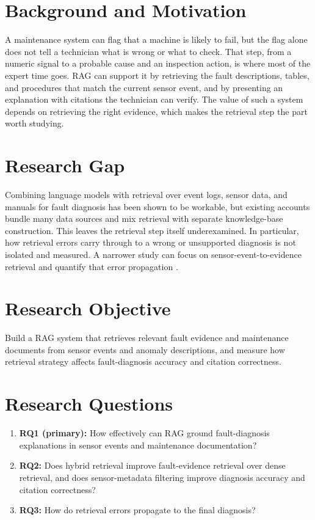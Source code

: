 \documentclass[10pt,a4paper]{article}
\begin{document}
\section{Background and Motivation}

A maintenance system can flag that a machine is likely to fail, but the flag alone does not tell a technician what is wrong or what to check. That step, from a numeric signal to a probable cause and an inspection action, is where most of the expert time goes. RAG can support it by retrieving the fault descriptions, tables, and procedures that match the current sensor event, and by presenting an explanation with citations the technician can verify. The value of such a system depends on retrieving the right evidence, which makes the retrieval step the part worth studying.

\section{Research Gap}

Combining language models with retrieval over event logs, sensor data, and manuals for fault diagnosis has been shown to be workable, but existing accounts bundle many data sources and mix retrieval with separate knowledge-base construction. This leaves the retrieval step itself underexamined. In particular, how retrieval errors carry through to a wrong or unsupported diagnosis is not isolated and measured. A narrower study can focus on sensor-event-to-evidence retrieval and quantify that error propagation \cite{gao2024survey, es2024ragas}.

\section{Research Objective}

Build a RAG system that retrieves relevant fault evidence and maintenance documents from sensor events and anomaly descriptions, and measure how retrieval strategy affects fault-diagnosis accuracy and citation correctness.

\section{Research Questions}

\begin{enumerate}
    \item \textbf{RQ1 (primary):} How effectively can RAG ground fault-diagnosis explanations in sensor events and maintenance documentation?
    \item \textbf{RQ2:} Does hybrid retrieval improve fault-evidence retrieval over dense retrieval, and does sensor-metadata filtering improve diagnosis accuracy and citation correctness?
    \item \textbf{RQ3:} How do retrieval errors propagate to the final diagnosis?
\end{enumerate}
\end{document}
